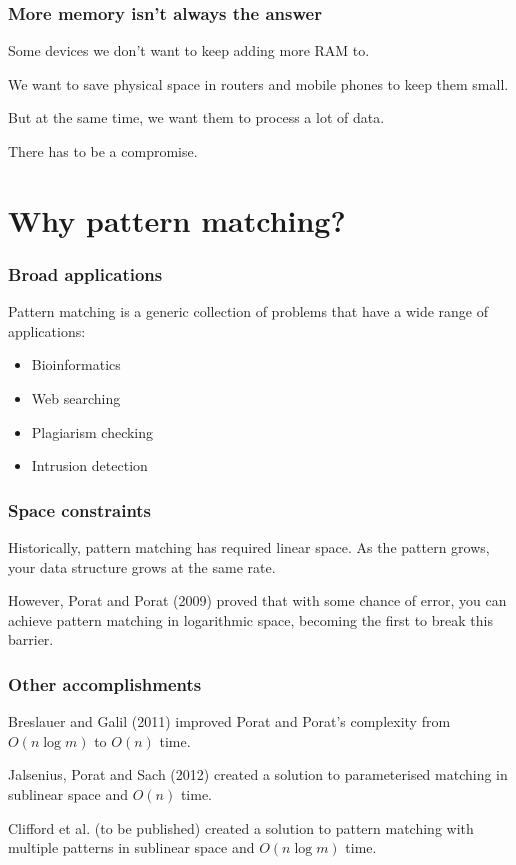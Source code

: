 \documentclass{beamer}
\begin{document}

\begin{frame}
\frametitle{More memory isn't always the answer}
Some devices we don't want to keep adding more RAM to.

We want to save physical space in routers and mobile phones to keep them small.

But at the same time, we want them to process a lot of data.

There has to be a compromise.
\end{frame}

\section{Why pattern matching?}

\begin{frame}
\frametitle{Broad applications}
Pattern matching is a generic collection of problems that have a wide range of applications:

\begin{itemize}
    \item Bioinformatics
    \item Web searching
    \item Plagiarism checking
    \item Intrusion detection
\end{itemize}
\end{frame}


\begin{frame}
\frametitle{Space constraints}
Historically, pattern matching has required linear space. As the pattern grows, your data structure grows at the same rate.

However, Porat and Porat (2009) proved that with some chance of error, you can achieve pattern matching in logarithmic space, becoming the first to break this barrier.
\end{frame}


\begin{frame}
\frametitle{Other accomplishments}
Breslauer and Galil (2011) improved Porat and Porat's complexity from $O(n\log m)$ to $O(n)$ time.

Jalsenius, Porat and Sach (2012) created a solution to parameterised matching in sublinear space and $O(n)$ time.

Clifford et al. (to be published) created a solution to pattern matching with multiple patterns in sublinear space and $O(n\log m)$ time.
\end{frame}
\end{document}
